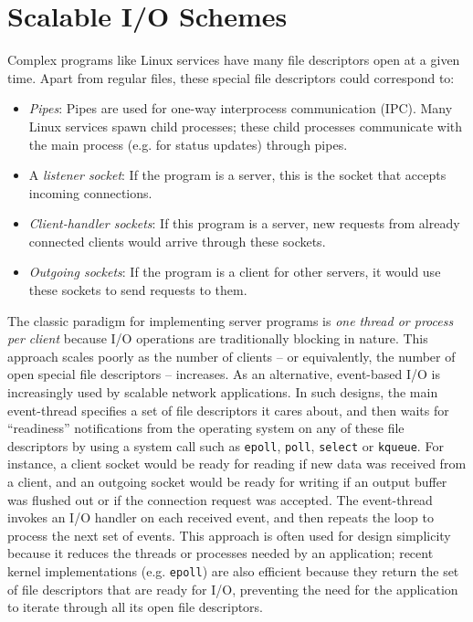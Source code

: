 \section{Scalable I/O Schemes} \label{ch3:poll}
 \newline
Complex programs like Linux services have
many file descriptors open at a given time.
Apart from regular files, these special 
file descriptors could correspond to:

\begin{itemize}

\item {\em Pipes}: Pipes are used for
  one-way interprocess communication (IPC).
  Many Linux services spawn child processes;
  these child processes communicate
  with the main process (e.g. for status
  updates) through pipes.
\newpage
\item A {\em listener socket}:
  If the program is a server,
  this is the socket that accepts incoming connections.

\item {\em Client-handler sockets}:
  If this program is a server, 
  new requests from already connected clients would arrive through
  these sockets.

\item {\em Outgoing sockets}:
  If the program is a client for other servers,
  it would use these sockets to send requests 
  to them.
\end{itemize}

The classic paradigm for implementing server
programs is {\em one thread or process per client}
because I/O operations are traditionally blocking
in nature. This approach scales poorly as the number
of clients -- or equivalently, the number of open special file descriptors -- increases. 
As an alternative, event-based I/O is increasingly used 
by scalable network applications.
In such designs, the main event-thread
specifies a set of file descriptors it cares about,
and then waits for ``readiness'' notifications 
from the operating system on any of
these file descriptors by using a
system call such as \texttt{epoll}, \texttt{poll},
\texttt{select} or \texttt{kqueue}. 
For instance, a client socket would be ready 
for reading if new data was received from a client,
and an outgoing socket would be ready for 
writing if an output buffer was flushed out or if the 
connection request was accepted.
The event-thread invokes an I/O
handler on each received event, 
and then repeats the loop to process the next
set of events.
This approach is often used for design simplicity because it
reduces the threads or processes needed by an application; 
recent kernel implementations (e.g. \texttt{epoll}) are also
efficient because they return the set of file descriptors that are ready for I/O,
preventing the need for the application to iterate through all its open
file descriptors. 

